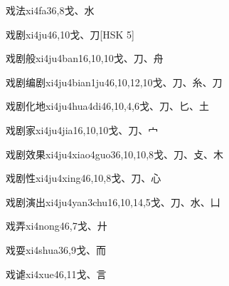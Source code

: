 \begin{entry}{戏法}{xi4fa3}{6,8}{⼽、⽔}
\end{entry}

\begin{entry}{戏剧}{xi4ju4}{6,10}{⼽、⼑}[HSK 5]
\end{entry}

\begin{entry}{戏剧般}{xi4ju4ban1}{6,10,10}{⼽、⼑、⾈}
\end{entry}

\begin{entry}{戏剧编剧}{xi4ju4bian1ju4}{6,10,12,10}{⼽、⼑、⽷、⼑}
\end{entry}

\begin{entry}{戏剧化地}{xi4ju4hua4di4}{6,10,4,6}{⼽、⼑、⼔、⼟}
\end{entry}

\begin{entry}{戏剧家}{xi4ju4jia1}{6,10,10}{⼽、⼑、⼧}
\end{entry}

\begin{entry}{戏剧效果}{xi4ju4xiao4guo3}{6,10,10,8}{⼽、⼑、⽁、⽊}
\end{entry}

\begin{entry}{戏剧性}{xi4ju4xing4}{6,10,8}{⼽、⼑、⼼}
\end{entry}

\begin{entry}{戏剧演出}{xi4ju4yan3chu1}{6,10,14,5}{⼽、⼑、⽔、⼐}
\end{entry}

\begin{entry}{戏弄}{xi4nong4}{6,7}{⼽、⼶}
\end{entry}

\begin{entry}{戏耍}{xi4shua3}{6,9}{⼽、⽽}
\end{entry}

\begin{entry}{戏谑}{xi4xue4}{6,11}{⼽、⾔}
\end{entry}

